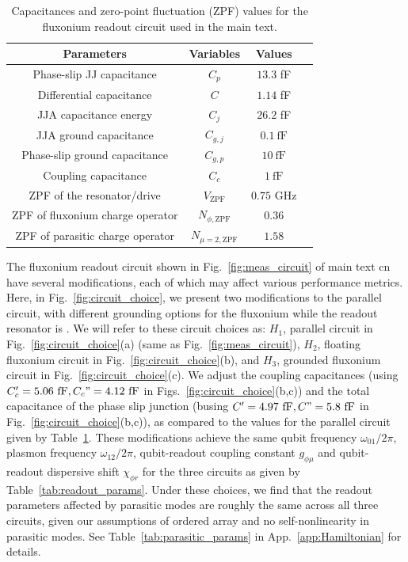 \documentclass[%
reprint,
superscriptaddress,
 amsmath,amssymb,
 aps,
 prx,
longbibliography,
floatfix,
]{revtex4-2}
\newcommand{\singh}[1]{{\color{orange}{{}#1}}}%
\begin{document}
\begin{table}[htb]
    \begin{center}
    \begin{tabular}{|c |c| c |c| }
     \hline
     \textbf{Parameters} & \textbf{Variables} & \textbf{Values}\\ 
    \hline
    Phase-slip JJ capacitance &$C_p$ &$13.3$ fF\\ 
    \hline
    Differential capacitance &$C$ &$1.14$ fF\\ 
    \hline
    JJA capacitance energy&$C_j$&$26.2$ fF\\ 
    \hline
    JJA ground capacitance&$C_{g,j}$&$0.1 \ \mathrm{fF}$\\ 
    \hline
    Phase-slip ground capacitance&$C_{g,p}$&$10 \ \mathrm{fF}$\\ 
    \hline
    Coupling capacitance&$C_c$ &$1 \ \mathrm{fF}$\\ 
     \hline
      ZPF of the resonator/drive&$V_{\mathrm{ZPF}}$&$0.75$ GHz\\
     \hline
      ZPF of fluxonium charge operator&$N_{\phi,\mathrm{ZPF}}$&$0.36$\\
     \hline
      ZPF of parasitic charge operator&$N_{\mu=2,\mathrm{ZPF}}$&$1.58$\\
     \hline
    \end{tabular}
    \end{center}
    
    \caption{Capacitances and zero-point fluctuation (ZPF) values for the fluxonium readout circuit used in the main text.}
    \label{tab:params}
    \end{table}
The fluxonium readout circuit shown in Fig.~\ref{fig:meas_circuit} of main text cn have several modifications, each of which may affect various performance metrics. Here, in Fig.~\ref{fig:circuit_choice}, we present two modifications to the parallel circuit, with different grounding options for the fluxonium while the readout resonator is \singh{grounded}. We will refer to these circuit choices as: $H_1$, parallel circuit in Fig.~\ref{fig:circuit_choice}(a) (same as Fig.~\ref{fig:meas_circuit}), $H_2$, floating fluxonium circuit in Fig.~\ref{fig:circuit_choice}(b), and $H_3$, grounded fluxonium circuit in Fig.~\ref{fig:circuit_choice}(c). We adjust the coupling capacitances (using $C_c'=5.06 \ \mathrm{fF},C_c"=4.12 \ \mathrm{fF}$ in Figs.~\ref{fig:circuit_choice}(b,c)) and the total capacitance of the phase slip junction (busing $C'=4.97 \ \mathrm{fF},C"=5.8 \ \mathrm{fF}$ in Fig.~\ref{fig:circuit_choice}(b,c)), as compared to the values for the parallel circuit given by Table~\ref{tab:params}. These modifications achieve the same qubit frequency $\omega_{01}/2\pi$, plasmon frequency $\omega_{12}/2\pi$, qubit-readout coupling constant $g_{\phi \mu}$ and qubit-readout dispersive shift $\chi_{\phi r}$ for the three circuits as given by Table~\ref{tab:readout_params}. Under these choices, we find that the readout parameters affected by parasitic modes are roughly the same across all three circuits, given our assumptions of ordered array and no self-nonlinearity in parasitic modes. See Table~\ref{tab:parasitic_params} in App.~\ref{app:Hamiltonian} for details. 
\end{document}
